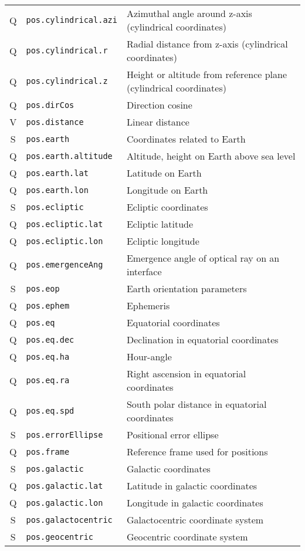 \documentclass[11pt,a4paper]{ivoa}
\begin{document}
\begin{longtable}[h!]{c|p{40ex}|p{}}
Q & {\tt pos.cylindrical.azi} & Azimuthal angle around z-axis (cylindrical coordinates)\\
Q & {\tt pos.cylindrical.r} & Radial distance from z-axis (cylindrical coordinates)\\
Q & {\tt pos.cylindrical.z} & Height or altitude from reference plane (cylindrical coordinates)\\
Q & {\tt pos.dirCos} & Direction cosine\\
V & {\tt pos.distance} & Linear distance\\
S & {\tt pos.earth} & Coordinates related to Earth\\
Q & {\tt pos.earth.altitude} & Altitude, height on Earth  above sea level\\
Q & {\tt pos.earth.lat} & Latitude on Earth\\
Q & {\tt pos.earth.lon} & Longitude on Earth\\
S & {\tt pos.ecliptic} & Ecliptic coordinates\\
Q & {\tt pos.ecliptic.lat} & Ecliptic latitude\\
Q & {\tt pos.ecliptic.lon} & Ecliptic longitude\\
Q & {\tt pos.emergenceAng} & Emergence angle of optical ray on an interface\\
S & {\tt pos.eop} & Earth orientation parameters\\
Q & {\tt pos.ephem} & Ephemeris\\
Q & {\tt pos.eq} & Equatorial coordinates\\
Q & {\tt pos.eq.dec} & Declination in equatorial coordinates\\
Q & {\tt pos.eq.ha} & Hour-angle\\
Q & {\tt pos.eq.ra} & Right ascension in equatorial coordinates\\
Q & {\tt pos.eq.spd} & South polar distance in equatorial coordinates\\
S & {\tt pos.errorEllipse} & Positional error ellipse\\
Q & {\tt pos.frame} & Reference frame used for positions\\
S & {\tt pos.galactic} & Galactic coordinates\\
Q & {\tt pos.galactic.lat} & Latitude in galactic coordinates\\
Q & {\tt pos.galactic.lon} & Longitude in galactic coordinates\\
S & {\tt pos.galactocentric} & Galactocentric coordinate system\\
S & {\tt pos.geocentric} & Geocentric coordinate system\\

\end{longtable}
\end{document}
